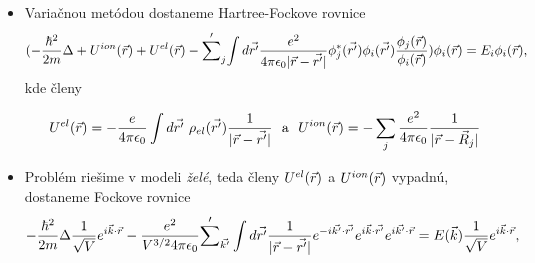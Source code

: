 \documentclass[
	11pt, %
]{beamer}
\begin{document}
\begin{frame}


\begin{itemize}

\item Variačnou metódou dostaneme Hartree-Fockove rovnice
\tiny
\begin{equation}
\label{eq:fock3}
(-\frac{\hbar^2}{2m}\Delta +U^{ion}(\vec{r})+U^{el}(\vec{r})-
{\sum'}_j{\int d\vec{r'}\frac{e^2}{4\pi \epsilon_0|\vec{r}-\vec{r'}|}
\phi_j^{*}(\vec{r'})\phi_i(\vec{r'})\frac{\phi_j(\vec{r})}{\phi_i(\vec{r})}})\phi_i({\vec{r}})=E_i\phi_i(\vec{r}) \text{,}
\end{equation}
\normalsize
kde členy

\begin{equation}
\label{eq:hartree a ion}
U^{el}(\vec{r}) = -\frac{e}{4\pi \epsilon_0} \int d\vec{r'}\ \rho_{el}(\vec{r'}) \frac {1}{|\vec{r}-\vec{r'}|} \ \  \text{a} \ \  U^{ion}(\vec{r}) = -\sum_j\frac{e^2}{4\pi \epsilon_0}{\frac{1}{|\vec{r}-\vec{R}_j|}}
\end{equation}
\normalsize
\item Problém riešime v modeli \emph{želé}, teda členy $U^{el}(\vec{r})$ a $U^{ion}(\vec{r})$ vypadnú, dostaneme Fockove rovnice
\small
\begin{equation}
\label{eq:fock_final}
-\frac{\hbar^2}{2m}\Delta \frac{1}{\sqrt V}e^{i\vec{k}\cdot\vec{r}}-\frac{e^2}{V^{3/2}4\pi\epsilon_0}{\sum'}_{\vec{k'}}\int d\vec{r'} \frac{1}{|\vec{r}-\vec{r'}|} e^{-i\vec{k'} \cdot \vec{r'} }e^{i\vec{k} \cdot \vec{r'}}e^{i\vec{k'} \cdot \vec{r}}=E(\vec{k})\frac{1}{\sqrt V}e^{i\vec{k} \cdot \vec{r}} \text{,}
\end{equation}
\normalsize
\end{itemize}
\end{frame}
\end{document}
